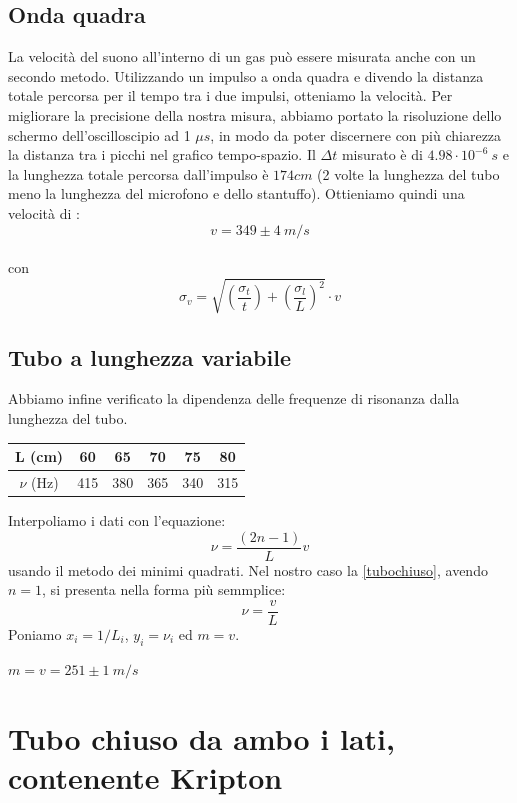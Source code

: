 \subsection{Onda quadra}
La velocità del suono all'interno di un gas può essere misurata anche con un secondo metodo. Utilizzando un impulso a onda quadra e divendo la distanza totale percorsa per il tempo tra i due impulsi, otteniamo la velocità.  Per migliorare la precisione della nostra misura, abbiamo portato la risoluzione dello schermo dell'oscilloscipio ad 1 $\mu s$, in modo da poter discernere con più chiarezza la distanza tra i picchi nel grafico tempo-spazio.
Il $\Delta t$ misurato è di $4.98 \cdot 10^{-6} \ s$ e la lunghezza totale percorsa dall'impulso è $174 cm$ (2 volte la lunghezza del tubo meno la lunghezza del microfono e dello stantuffo). Ottieniamo quindi una velocità di :
$$v = 349 \pm 4 \ m/s$$
\\
con $$\sigma_v=\sqrt{\left(\frac{\sigma_t}{t}\right)+\left(\frac{\sigma_l}{L} \right)^2} \cdot v$$

\subsection{Tubo a lunghezza variabile}
Abbiamo infine verificato la dipendenza delle frequenze di risonanza dalla lunghezza del tubo.

\begin{center}
\begin{tabular}{*{5}{c|}c}
L (cm) & 60 & 65 & 70 & 75 & 80 \\
\midrule
$\nu$ (Hz) &415 & 380 & 365 & 340 & 315\\
\end{tabular}
\end{center}
Interpoliamo i dati con l'equazione:
\begin{equation}\label{tubochiuso}
\nu=\frac{(2n-1)}{L}v
\end{equation} 
usando il metodo dei minimi quadrati. Nel nostro caso la \ref{tubochiuso}, avendo $n=1$, si presenta nella forma più semmplice:
$$\nu=\frac{v}{L}$$
Poniamo $x_i=1/L_i$, $y_i=\nu_i$ ed $m=v$.

\begin{center}

$m = v = 251\pm 1\ m/s$
\end{center}

\section{Tubo chiuso da ambo i lati, contenente Kripton}

